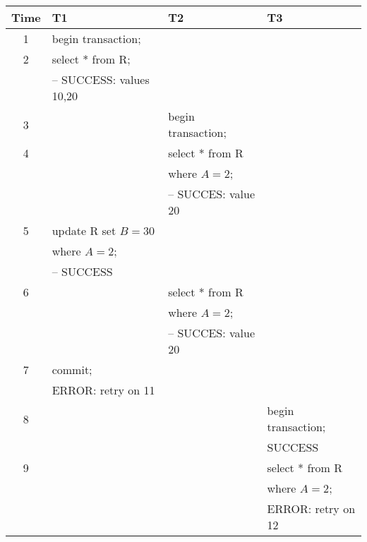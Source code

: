 \documentclass[addpoints,answers,12pt]{exam}
\begin{document}
\begin{questions}
\begin{parts}
\begin{subparts}
\begin{solution}
{\scriptsize
\begin{tabular}{|c|l|l|l|} \hline
  Time & T1 & T2 & T3 \\ \hline
1 & begin transaction;              &                    & \\ \hline
2 & select * from R;                &                    & \\
  & -- SUCCESS: values 10,20           &                    & \\ \hline
3 &                                 & begin transaction; & \\ \hline
4 &                                 & select * from R    & \\
  &                                 & where $A=2$;       & \\ 
  &                                 & -- SUCCES: value 20   & \\ \hline
5 & update R set $B=30$             &                    & \\
  & where $A=2$;                    &                    & \\
  & -- SUCCESS                         &                    & \\ \hline
6 &                                 &  select * from R   & \\
  &                                 &  where $A=2$;      & \\
  &                                 & -- SUCCES: value 20   & \\ \hline
7 & commit;                         &                    & \\
  & ERROR: retry on 11              &                    & \\ \hline
8 &                                 &                    & begin transaction; \\
  &                                 &                    & SUCCESS  \\ \hline
9 &                                 &                    & select * from R  \\
  &                                 &                    & where $A=2$; \\
  &                                 &                    & ERROR: retry on 12 \\ \hline

\end{tabular}}
\end{solution}
\end{subparts}
\end{parts}
\end{questions}
\end{document}
